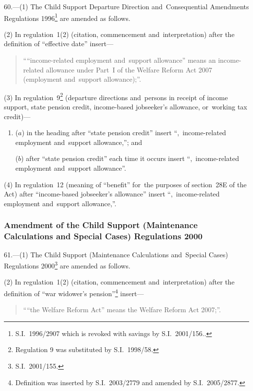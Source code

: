 \documentclass[12pt,a4paper]{article}
\begin{document}
60.---(1)  The Child Support Departure Direction and~Consequential Amendments Regulations 1996\footnote{S.I.~1996/2907 which is revoked with savings by S.I.~2001/156..} are amended as follows.

(2) In regulation~1(2) (citation, commencement and~interpretation) after the definition of “effective date” insert—
\begin{quotation}
““income-related employment and~support allowance” means an income-related allowance under Part~I of the Welfare Reform Act 2007 (employment and~support allowance);”.
\end{quotation}

(3) In regulation~9\footnote{Regulation 9 was substituted by S.I.~1998/58.} (departure directions and~persons in receipt of income support, state pension credit, income-based jobseeker’s allowance, or~working tax credit)—
\begin{enumerate}\item[]
($a$) in the heading after “state pension credit” insert “,~income-related employment and~support allowance,”; and

($b$) after “state pension credit” each time it occurs insert “,~income-related employment and~support allowance”.
\end{enumerate}

(4) In regulation~12 (meaning of “benefit” for~the purposes of section~28E of the Act) after “income-based jobseeker’s allowance” insert “,~income-related employment and~support allowance,”.

\subsubsection[61. Amendment of the Child Support (Maintenance Calculations and~Special Cases) Regulations 2000]{Amendment of the Child Support (Maintenance Calculations and Special Cases) Regulations 2000}

61.---(1)  The Child Support (Maintenance Calculations and~Special Cases) Regulations 2000\footnote{S.I.~2001/155.} are amended as follows.

(2) In regulation~1(2) (citation, commencement and~interpretation) after the definition of “war widower’s pension”\footnote{Definition was inserted by S.I.~2003/2779 and amended by S.I.~2005/2877.} insert—
\begin{quotation}
““the Welfare Reform Act” means the Welfare Reform Act 2007;”.
\end{quotation}
\end{document}
